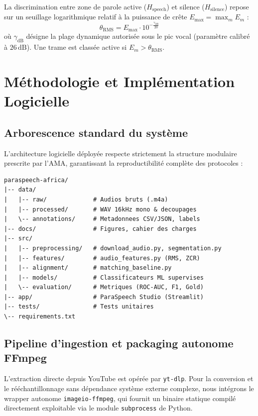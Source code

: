 \documentclass[10pt,a4paper,twocolumn]{article}
\begin{document}
La discrimination entre zone de parole active ($H_{\text{speech}}$) et silence ($H_{\text{silence}}$) repose sur un seuillage logarithmique relatif à la puissance de crête $E_{\max} = \max_m E_m$ :
\begin{equation}
\theta_{\text{RMS}} = E_{\max} \cdot 10^{-\frac{\gamma_{\text{dB}}}{20}}
\end{equation}
où $\gamma_{\text{dB}}$ désigne la plage dynamique autorisée sous le pic vocal (paramètre calibré à $26\,\text{dB}$). Une trame est classée active si $E_m > \theta_{\text{RMS}}$.

\section{Méthodologie et Implémentation Logicielle}

\subsection{Arborescence standard du système}
L'architecture logicielle déployée respecte strictement la structure modulaire prescrite par l'AMA, garantissant la reproductibilité complète des protocoles :
\begin{verbatim}
paraspeech-africa/
|-- data/
|   |-- raw/             # Audios bruts (.m4a)
|   |-- processed/       # WAV 16kHz mono & decoupages
|   \-- annotations/     # Metadonnees CSV/JSON, labels
|-- docs/                # Figures, cahier des charges
|-- src/
|   |-- preprocessing/   # download_audio.py, segmentation.py
|   |-- features/        # audio_features.py (RMS, ZCR)
|   |-- alignment/       # matching_baseline.py
|   |-- models/          # Classificateurs ML supervises
|   \-- evaluation/      # Metriques (ROC-AUC, F1, Gold)
|-- app/                 # ParaSpeech Studio (Streamlit)
|-- tests/               # Tests unitaires
\-- requirements.txt
\end{verbatim}

\subsection{Pipeline d'ingestion et packaging autonome FFmpeg}
L'extraction directe depuis YouTube est opérée par \texttt{yt-dlp}. Pour la conversion et le rééchantillonnage sans dépendance système externe complexe, nous intégrons le wrapper autonome \texttt{imageio-ffmpeg}, qui fournit un binaire statique compilé directement exploitable via le module \texttt{subprocess} de Python.
\end{document}
